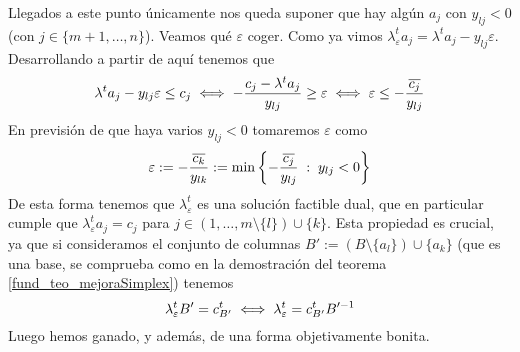 Llegados a este punto únicamente nos queda suponer que hay algún $a_j$ con $y_{lj}<0$ (con $j\in\{m+1,\dots,n\}$). Veamos qué $\varepsilon$ coger. Como ya vimos $\lambda_\varepsilon^ta_j=\lambda^ta_j-y_{lj}\varepsilon$. Desarrollando a partir de aquí tenemos que
\begin{equation*}
	\lambda^ta_j-y_{lj}\varepsilon\leq c_j\iff -\frac{c_j-\lambda^ta_j}{y_{lj}}\geq \varepsilon\iff \varepsilon\leq -\frac{\overline{c_j}}{y_{lj}}
\end{equation*}
En previsión de que haya varios $y_{lj}<0$ tomaremos $\varepsilon$ como
\begin{equation*}
	\varepsilon:=-\frac{\overline{c_k}}{y_{lk}}:=\min\left\{-\frac{\overline{c_j}}{y_{lj}}\;:\; y_{lj}<0\right\}
\end{equation*}
De esta forma tenemos que $\lambda_\varepsilon^t$ es una solución factible dual, que en particular cumple que $\lambda_\varepsilon^ta_j=c_j$ para $j\in({1,\dots,m}\setminus\{l\})\cup\{k\}$. Esta propiedad es crucial, ya que si consideramos el conjunto de columnas $B':=(B\setminus\{a_l\})\cup\{a_k\}$ (que es una base, se comprueba como en la demostración del teorema \ref{fund_teo_mejoraSimplex}) tenemos
\begin{equation*}
	\lambda_\varepsilon^tB'=c_{B'}^t\iff \lambda_\varepsilon^t=c_{B'}^tB'^{-1}
\end{equation*}
Luego hemos ganado, y además, de una forma objetivamente bonita.

